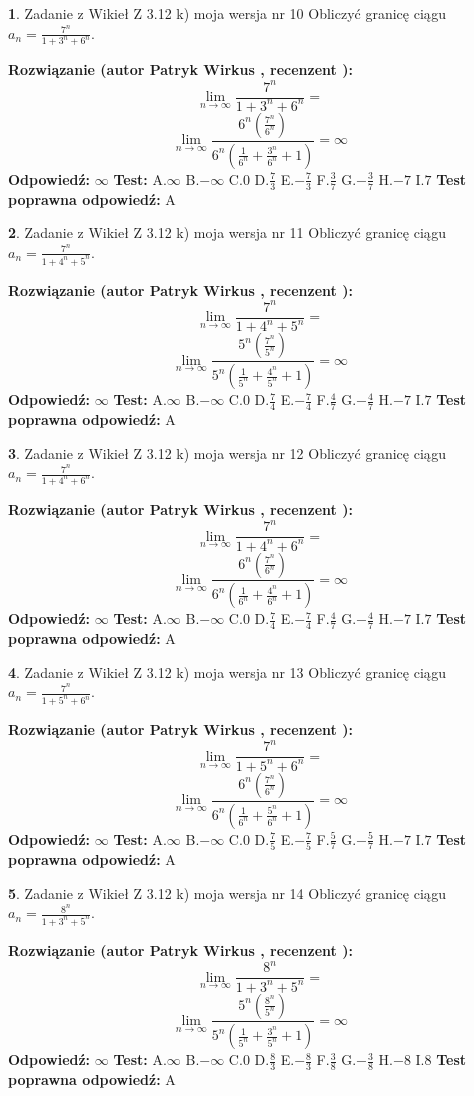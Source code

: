 \documentclass[12pt, a4paper]{article}
\theoremstyle{definition} %
\newtheorem{zad}{}
\newcommand{\zadStart}[1]{\begin{zad}#1\newline}
\newcommand{\zadStop}{\end{zad}}
\newcommand{\rozwStart}[2]{\noindent \textbf{Rozwiązanie (autor #1 , recenzent #2): }\newline}
\newcommand{\rozwStop}{\newline}
\newcommand{\odpStart}{\noindent \textbf{Odpowiedź:}\newline}
\newcommand{\odpStop}{\newline}
\newcommand{\testStart}{\noindent \textbf{Test:}\newline}
\newcommand{\testStop}{\newline}
\newcommand{\kluczStart}{\noindent \textbf{Test poprawna odpowiedź:}\newline}
\newcommand{\kluczStop}{\newline}
\begin{document}
\zadStart{Zadanie z Wikieł Z 3.12 k) moja wersja nr 10}
Obliczyć granicę ciągu $a_{n}=\frac{7^{n}}{1+3^{n} + 6^{n}}$.
\zadStop
\rozwStart{Patryk Wirkus}{}
$$\lim\limits_{n\to\infty}\frac{7^{n}}{1+3^{n} + 6^{n}}=$$
$$\lim\limits_{n\to\infty}\frac{6^{n}(\frac{7^{n}}{6^{n}} )}{6^{n}(\frac{1}{6^{n}}+\frac{3^{n}}{6^{n}}+1)} = \infty$$
\rozwStop
\odpStart
$\infty$
\odpStop
\testStart
A.$\infty$
B.$-\infty$
C.$0$
D.$\frac{7}{3}$
E.$-\frac{7}{3}$
F.$\frac{3}{7}$
G.$-\frac{3}{7}$
H.$-7$
I.$7$
\testStop
\kluczStart
A
\kluczStop



\zadStart{Zadanie z Wikieł Z 3.12 k) moja wersja nr 11}
Obliczyć granicę ciągu $a_{n}=\frac{7^{n}}{1+4^{n} + 5^{n}}$.
\zadStop
\rozwStart{Patryk Wirkus}{}
$$\lim\limits_{n\to\infty}\frac{7^{n}}{1+4^{n} + 5^{n}}=$$
$$\lim\limits_{n\to\infty}\frac{5^{n}(\frac{7^{n}}{5^{n}} )}{5^{n}(\frac{1}{5^{n}}+\frac{4^{n}}{5^{n}}+1)} = \infty$$
\rozwStop
\odpStart
$\infty$
\odpStop
\testStart
A.$\infty$
B.$-\infty$
C.$0$
D.$\frac{7}{4}$
E.$-\frac{7}{4}$
F.$\frac{4}{7}$
G.$-\frac{4}{7}$
H.$-7$
I.$7$
\testStop
\kluczStart
A
\kluczStop



\zadStart{Zadanie z Wikieł Z 3.12 k) moja wersja nr 12}
Obliczyć granicę ciągu $a_{n}=\frac{7^{n}}{1+4^{n} + 6^{n}}$.
\zadStop
\rozwStart{Patryk Wirkus}{}
$$\lim\limits_{n\to\infty}\frac{7^{n}}{1+4^{n} + 6^{n}}=$$
$$\lim\limits_{n\to\infty}\frac{6^{n}(\frac{7^{n}}{6^{n}} )}{6^{n}(\frac{1}{6^{n}}+\frac{4^{n}}{6^{n}}+1)} = \infty$$
\rozwStop
\odpStart
$\infty$
\odpStop
\testStart
A.$\infty$
B.$-\infty$
C.$0$
D.$\frac{7}{4}$
E.$-\frac{7}{4}$
F.$\frac{4}{7}$
G.$-\frac{4}{7}$
H.$-7$
I.$7$
\testStop
\kluczStart
A
\kluczStop



\zadStart{Zadanie z Wikieł Z 3.12 k) moja wersja nr 13}
Obliczyć granicę ciągu $a_{n}=\frac{7^{n}}{1+5^{n} + 6^{n}}$.
\zadStop
\rozwStart{Patryk Wirkus}{}
$$\lim\limits_{n\to\infty}\frac{7^{n}}{1+5^{n} + 6^{n}}=$$
$$\lim\limits_{n\to\infty}\frac{6^{n}(\frac{7^{n}}{6^{n}} )}{6^{n}(\frac{1}{6^{n}}+\frac{5^{n}}{6^{n}}+1)} = \infty$$
\rozwStop
\odpStart
$\infty$
\odpStop
\testStart
A.$\infty$
B.$-\infty$
C.$0$
D.$\frac{7}{5}$
E.$-\frac{7}{5}$
F.$\frac{5}{7}$
G.$-\frac{5}{7}$
H.$-7$
I.$7$
\testStop
\kluczStart
A
\kluczStop



\zadStart{Zadanie z Wikieł Z 3.12 k) moja wersja nr 14}
Obliczyć granicę ciągu $a_{n}=\frac{8^{n}}{1+3^{n} + 5^{n}}$.
\zadStop
\rozwStart{Patryk Wirkus}{}
$$\lim\limits_{n\to\infty}\frac{8^{n}}{1+3^{n} + 5^{n}}=$$
$$\lim\limits_{n\to\infty}\frac{5^{n}(\frac{8^{n}}{5^{n}} )}{5^{n}(\frac{1}{5^{n}}+\frac{3^{n}}{5^{n}}+1)} = \infty$$
\rozwStop
\odpStart
$\infty$
\odpStop
\testStart
A.$\infty$
B.$-\infty$
C.$0$
D.$\frac{8}{3}$
E.$-\frac{8}{3}$
F.$\frac{3}{8}$
G.$-\frac{3}{8}$
H.$-8$
I.$8$
\testStop
\kluczStart
A
\kluczStop
\end{document}
